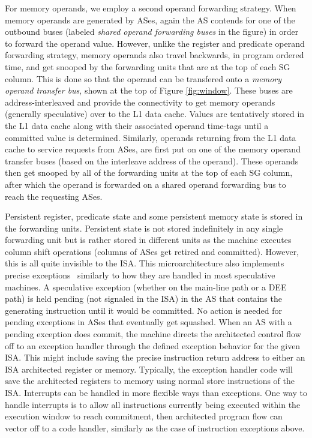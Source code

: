 \documentclass[10pt,dvips]{article}
\begin{document}
For memory operands, we employ a second operand forwarding strategy.
When memory operands are generated by ASes, again the AS contends
for one of the outbound buses 
(labeled \textit{shared operand forwarding buses} in the figure) 
in order to forward the operand value.
However, unlike the register and predicate operand forwarding
strategy, memory operands also travel backwards, in program ordered
time, and get snooped by the forwarding units that are at the top
of each SG column.  This is done so that the operand can
be transfered onto a \textit{memory operand transfer bus}, shown
at the top of Figure \ref{fig:window}.  
These buses are address-interleaved and
provide the connectivity to get memory operands (generally
speculative) over to the L1 data cache.
Values are tentatively stored in the L1 data cache along with 
their associated operand
time-tags until a committed value is determined.
Similarly, operands returning from the L1 data cache to service requests
from ASes, are first put on one of the memory operand transfer buses (based
on the interleave address of the operand).  These operands then get snooped
by all of the forwarding units at the top of each SG
column, after which the operand is forwarded on a shared operand
forwarding bus to reach the requesting ASes.

Persistent register, predicate state and some persistent
memory state is stored in the forwarding units.
Persistent state is not stored indefinitely in any single forwarding
unit but is rather stored in different units as the machine
executes column shift operations (columns of ASes get retired
and committed).  However, this is all quite invisible to the ISA.
This microarchitecture also implements precise exceptions~\cite{Smi88}
similarly to how they
are handled in most speculative machines.  
A speculative exception (whether on the main-line path or a DEE path)
is held pending (not signaled in the ISA)
in the AS that contains the generating
instruction until it would be committed.
No action is needed for pending exceptions in ASes that eventually
get squashed.
When an AS with a pending exception does commit, the machine directs the
architected control flow off to an exception handler through
the defined exception behavior for the given ISA.
This might include saving the precise instruction return
address to either an ISA architected register or memory.
Typically, the exception handler code will save the architected
registers to memory using normal
store instructions of the ISA.
Interrupts can be handled in more flexible ways than exceptions.
One way to handle interrupts is to allow all instructions
currently being executed within the execution window to reach
commitment, then architected program flow can vector off to
a code handler, similarly as the case of instruction exceptions above.
%
%
\end{document}
